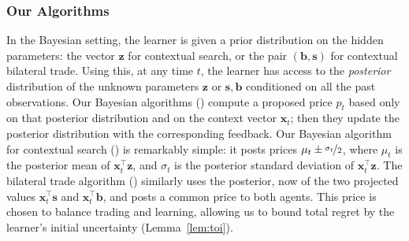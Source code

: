 \documentclass[11pt]{article}
\newcommand{\bs}{\boldsymbol s}
\newcommand{\bb}{\boldsymbol b}
\newcommand{\bx}{\boldsymbol x}
\newcommand{\bz}{\boldsymbol z}
\begin{document}
\subsubsection{Our Algorithms}

In the Bayesian setting, the learner is given a prior distribution on
the hidden {parameters}: the vector $\bz$ for contextual search, or
the pair $(\bb, \bs)$ for contextual bilateral trade. Using this, at
any time $t$, the learner has access to the \emph{posterior}
distribution of the unknown parameters $\bz$ or $\bs,\bb$ conditioned
on all the past observations. Our Bayesian algorithms
() compute a proposed price
$p_t$ based only on that posterior distribution and on the context
vector $\bx_t$; then they update the posterior distribution with the corresponding feedback. Our Bayesian
algorithm for contextual search () is remarkably
simple: it posts prices $\mu_t \pm \nicefrac{\sigma_t}{2}$, where
$\mu_t$ is the posterior mean of $\bx_t^\top\bz$, and $\sigma_t$ is the
posterior standard deviation of $\bx_t^\top\bz$. 
{The bilateral trade algorithm () similarly uses the posterior, now of the two projected values $\bx_t^\top\bs$ and $\bx_t^\top\bb$, and posts a common price to both agents. This price is chosen to balance trading and learning, allowing us to bound total regret by the learner's initial uncertainty (Lemma~\ref{lem:toi}).}
\end{document}

